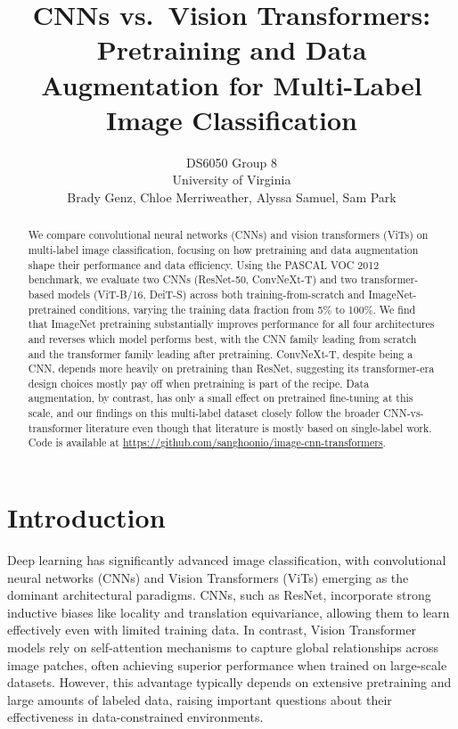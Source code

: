 \documentclass{article}
\title{CNNs vs.\ Vision Transformers: Pretraining and Data Augmentation for Multi-Label Image Classification}
\author{%
  DS6050 Group 8 \\
  University of Virginia \\
  Brady Genz, Chloe Merriweather, Alyssa Samuel, Sam Park \\
}
\begin{document}
\maketitle

\begin{abstract}
We compare convolutional neural networks (CNNs) and vision transformers (ViTs) on multi-label image classification, focusing on how pretraining and data augmentation shape their performance and data efficiency. Using the PASCAL VOC 2012 benchmark, we evaluate two CNNs (ResNet-50, ConvNeXt-T) and two transformer-based models (ViT-B/16, DeiT-S) across both training-from-scratch and ImageNet-pretrained conditions, varying the training data fraction from 5\% to 100\%. We find that ImageNet pretraining substantially improves performance for all four architectures and reverses which model performs best, with the CNN family leading from scratch and the transformer family leading after pretraining. ConvNeXt-T, despite being a CNN, depends more heavily on pretraining than ResNet, suggesting its transformer-era design choices mostly pay off when pretraining is part of the recipe. Data augmentation, by contrast, has only a small effect on pretrained fine-tuning at this scale, and our findings on this multi-label dataset closely follow the broader CNN-vs-transformer literature even though that literature is mostly based on single-label work. Code is available at \url{https://github.com/sanghoonio/image-cnn-transformers}.
\end{abstract}


\section{Introduction}

Deep learning has significantly advanced image classification, with convolutional neural networks (CNNs) and Vision Transformers (ViTs) emerging as the dominant architectural paradigms. CNNs, such as ResNet, incorporate strong inductive biases like locality and translation equivariance, allowing them to learn effectively even with limited training data. In contrast, Vision Transformer models rely on self-attention mechanisms to capture global relationships across image patches, often achieving superior performance when trained on large-scale datasets. However, this advantage typically depends on extensive pretraining and large amounts of labeled data, raising important questions about their effectiveness in data-constrained environments.
\end{document}
